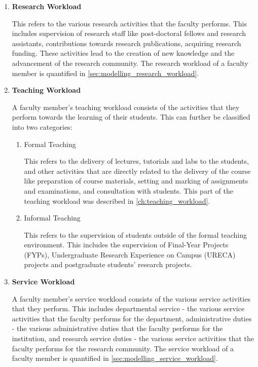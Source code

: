 \begin{enumerate}
  \item \textbf{Research Workload}

        This refers to the various research activities that the faculty performs. This includes supervision of research staff like post-doctoral fellows and research assistants, contributions towards research publications, acquiring research funding. These activities lead to the creation of new knowledge and the advancement of the research community. The research workload of a faculty member is quantified in \autoref{sec:modelling_research_workload}.

  \item \textbf{Teaching Workload}

        A faculty member's teaching workload consists of the activities that they perform towards the learning of their students. This can further be classified into two categories:

        \begin{enumerate}
          \item Formal Teaching

                This refers to the delivery of lectures, tutorials and labs to the students, and other activities that are directly related to the delivery of the course like preparation of course materials, setting and marking of assignments and examinations, and consultation with students. This part of the teaching workload was described in \autoref{ch:teaching_workload}.

          \item Informal Teaching

                This refers to the supervision of students outside of the formal teaching environment. This includes the supervision of Final-Year Projects (FYPs), Undergraduate Research Experience on Campus (URECA) projects and postgraduate students' research projects.

        \end{enumerate}

  \item \textbf{Service Workload}

        A faculty member's service workload consists of the various service activities that they perform. This includes departmental service - the various service activities that the faculty performs for the department, administrative duties - the various administrative duties that the faculty performs for the institution, and research service duties - the various service activities that the faculty performs for the research community. The service workload of a faculty member is quantified in \autoref{sec:modelling_service_workload}.

\end{enumerate}

